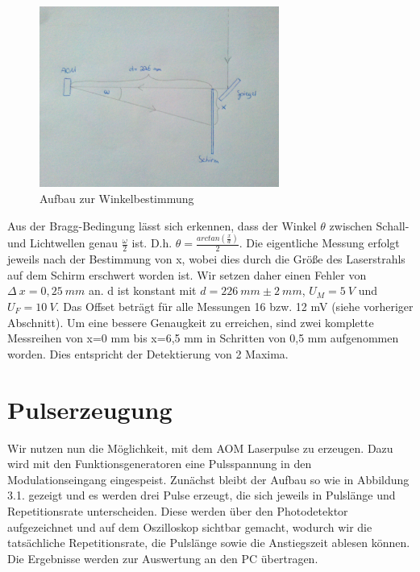 \documentclass[bigchapter,colorback,accentcolor=tud4b,linedtoc,11pt]{tudreport}
\begin{document}
\begin{figure}[H] 
  \centering
     \includegraphics[width=0.7\textwidth]{data/omega-bestimmung.jpg}
  \caption[Cap for listoffigures]{Aufbau zur Winkelbestimmung}
  \label{fig:Bild2}
\end{figure}

Aus der Bragg-Bedingung lässt sich erkennen, dass der Winkel $\theta$ zwischen Schall- und Lichtwellen genau $\frac{\omega}{2}$ ist. D.h. $\theta = \frac{arc tan (\frac{x}{d})}{2}$. Die eigentliche Messung erfolgt jeweils nach der Bestimmung von x, wobei dies durch die Größe des Laserstrahls auf dem Schirm erschwert worden ist. Wir setzen daher einen Fehler von $\Delta~x = 0,25~mm$ an. d ist konstant mit $d = 226~mm \pm 2~mm$, $U_M = 5~V$ und $U_F = 10~V$. Das Offset beträgt für alle Messungen 16 bzw. 12 mV (siehe vorheriger Abschnitt). Um eine bessere Genaugkeit zu erreichen, sind zwei komplette Messreihen von x=0 mm bis x=6,5 mm in Schritten von 0,5 mm aufgenommen worden. Dies entspricht der Detektierung von 2 Maxima.

\section{Pulserzeugung}

Wir nutzen nun die Möglichkeit, mit dem AOM Laserpulse zu erzeugen. Dazu wird mit den Funktionsgeneratoren eine Pulsspannung in den Modulationseingang eingespeist. Zunächst bleibt der Aufbau so wie in Abbildung 3.1. gezeigt und es werden drei Pulse erzeugt, die sich jeweils in Pulslänge und Repetitionsrate unterscheiden. Diese werden über den Photodetektor aufgezeichnet und auf dem Oszilloskop sichtbar gemacht, wodurch wir die tatsächliche Repetitionsrate, die Pulslänge sowie die Anstiegszeit ablesen können. Die Ergebnisse werden zur Auswertung an den PC übertragen. 
\end{document}
